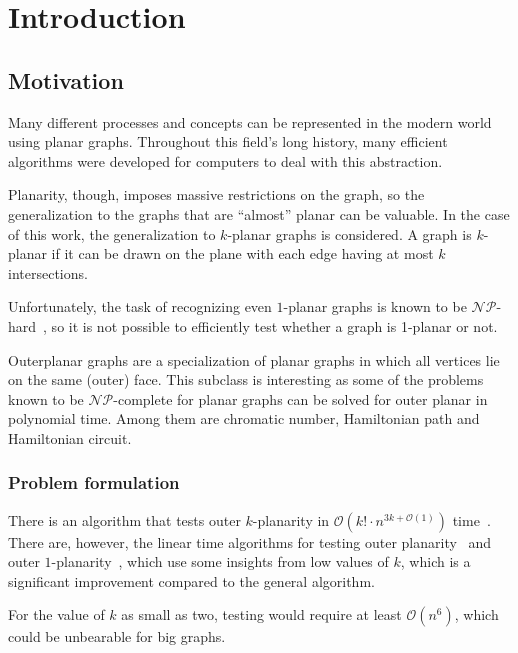 \chapter{Introduction}



\section{Motivation}

Many different processes and concepts can be represented in the modern world using planar graphs.
Throughout this field's long history, many efficient algorithms were developed for computers to deal with this abstraction.

Planarity, though, imposes massive restrictions on the graph, so the generalization to the graphs that are ``almost'' planar can be valuable.
In the case of this work, the generalization to \(k\)-planar graphs is considered.
A graph is \(k\)-planar if it can be drawn on the plane with each edge having at most \(k\) intersections.

Unfortunately, the task of recognizing even \(1\)-planar graphs is known to be \(\mathcal{NP}\)-hard~\cite{NP-hard-1p}, so it is not possible to efficiently test whether a graph is 1-planar or not.

Outerplanar graphs are a specialization of planar graphs in which all vertices lie on the same (outer) face.
This subclass is interesting as some of the problems known to be \(\mathcal{NP}\)-complete for planar graphs can be solved for outer planar in polynomial time.
Among them are chromatic number, Hamiltonian path and Hamiltonian circuit.

\subsection{Problem formulation}

There is an algorithm that tests outer \(k\)-planarity in \(\mathcal{O}(k!\cdot n^{3k+\mathcal{O}(1)})\) time~\cite{okp}.
There are, however, the linear time algorithms for testing outer planarity~\cite{linear-op} and outer \(1\)-planarity~\cite{linear-o1p, linear-o1p_}, which use some insights from low values of \(k\), which is a significant improvement compared to the general algorithm.

For the value of \(k\) as small as two, testing would require at least \(\mathcal{O}(n^6)\), which could be unbearable for big graphs.

